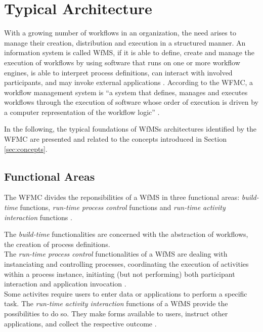 \section{Typical Architecture} %
\label{sec:typical_architecture}
  With a growing number of workflows in an organization, the need arises to manage their creation, distribution and execution in a structured manner. An information system is called \ac{WfMS}, if it is able to define, create and manage the execution of workflows by using software that runs on one or more workflow engines, is able to interpret process definitions, can interact with involved participants, and may invoke external applications \cite{Lawrence1997Workflow}. According to the \ac{WFMC}, a workflow management system is ``a system that defines, manages and executes workflows through the execution of software whose order of execution is driven by a computer representation of the workflow logic'' \cite{Hollingsworth1995Wfmc}.

  In the following, the typical foundations of \ac{WfMS}s architectures identified by the \ac{WFMC} are presented and related to the concepts introduced in Section \ref{sec:concepts}.

  \subsection{Functional Areas} %
  \label{sub:functional_areas}
    The \ac{WFMC} divides the reponsibilities of a \ac{WfMS} in three functional areas: \emph{build-time} functions, \emph{run-time process control} functions and \emph{run-time activity interaction} functions \cite{Hollingsworth1995Wfmc,Alonso1997Functionality}.
    
    The \emph{build-time} functionalities are concerned with the abstraction of workflows, \ie the creation of process definitions.\\
    The \emph{run-time process control} functionalities of a \ac{WfMS} are dealing with instanciating and controlling processes, coordinating the execution of activities within a process instance, initiating (but not performing) both participant interaction and application invocation \cite{Hollingsworth1995Wfmc}.\\
    Some activites require users to enter data or applications to perform a specific task. The \emph{run-time activity interaction} functions of a \ac{WfMS} provide the possibilities to do so. They make forms available to users, instruct other applications, and collect the respective outcome \cite{Hollingsworth1995Wfmc}.
  
